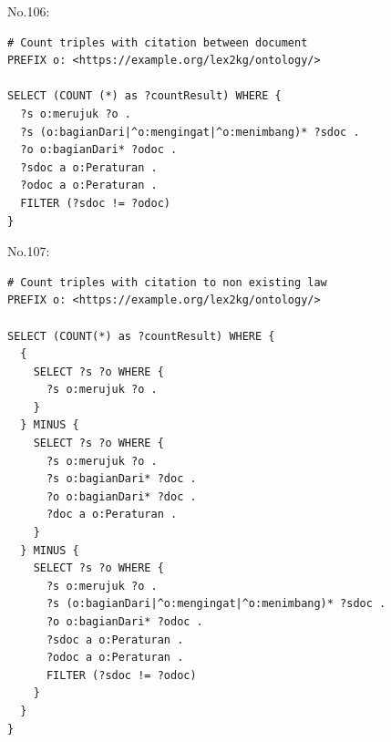 \noindent No.106:
\begin{lstlisting}
# Count triples with citation between document
PREFIX o: <https://example.org/lex2kg/ontology/>

SELECT (COUNT (*) as ?countResult) WHERE {
  ?s o:merujuk ?o .
  ?s (o:bagianDari|^o:mengingat|^o:menimbang)* ?sdoc .
  ?o o:bagianDari* ?odoc .
  ?sdoc a o:Peraturan .
  ?odoc a o:Peraturan .
  FILTER (?sdoc != ?odoc)
} 

\end{lstlisting}


\noindent No.107:
\begin{lstlisting}
# Count triples with citation to non existing law
PREFIX o: <https://example.org/lex2kg/ontology/>

SELECT (COUNT(*) as ?countResult) WHERE {
  {
    SELECT ?s ?o WHERE {
      ?s o:merujuk ?o .
    }
  } MINUS {
    SELECT ?s ?o WHERE {
      ?s o:merujuk ?o .
      ?s o:bagianDari* ?doc .
      ?o o:bagianDari* ?doc .
      ?doc a o:Peraturan .
    }
  } MINUS {
    SELECT ?s ?o WHERE {
      ?s o:merujuk ?o .
      ?s (o:bagianDari|^o:mengingat|^o:menimbang)* ?sdoc .
      ?o o:bagianDari* ?odoc .
      ?sdoc a o:Peraturan .
      ?odoc a o:Peraturan .
      FILTER (?sdoc != ?odoc)
    }
  }
} 

\end{lstlisting}
